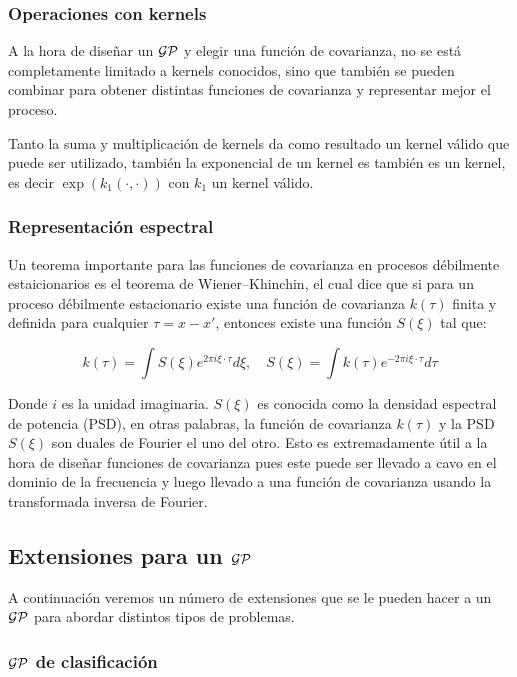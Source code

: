 \subsubsection{Operaciones con kernels}
A la hora de diseñar un $\mathcal{GP}$ y elegir una función de covarianza, no se está completamente limitado a kernels conocidos, sino que también se pueden combinar para obtener distintas funciones de covarianza y representar mejor el proceso.

Tanto la suma y multiplicación de kernels da como resultado un kernel válido que puede ser utilizado, también la exponencial de un kernel es también es un kernel, es decir $\exp(k_1(\cdot, \cdot))$ con $k_1$ un kernel válido.

\subsubsection{Representación espectral}
Un teorema importante para las funciones de covarianza en procesos débilmente estaicionarios es el teorema de Wiener–Khinchin, el cual dice que si para un proceso débilmente estacionario existe una función de covarianza $k(\tau)$ finita y definida para cualquier $\tau=x-x'$, entonces existe una función $S(\xi)$ tal que:

\begin{equation}\label{eq:gp_spectral}
	k(\tau) = \int S(\xi)e^{2\pi i \xi \cdot \tau} d\xi, \quad S(\xi)=\int k(\tau)e^{-2\pi i \xi \cdot \tau} d\tau
\end{equation}

Donde $i$ es la unidad imaginaria. $S(\xi)$ es conocida como la densidad espectral de potencia (PSD), en otras palabras, la función de covarianza $k(\tau)$ y la PSD $S(\xi)$ son duales de Fourier el uno del otro. Esto es extremadamente útil a la hora de diseñar funciones de covarianza pues este puede ser llevado a cavo en el dominio de la frecuencia y luego llevado a una función de covarianza usando la transformada inversa de Fourier.

\subsection{Extensiones para un $\mathcal{GP}$}
A continuación veremos un número de extensiones que se le pueden hacer a un $\mathcal{GP}$ para abordar distintos tipos de problemas.

\subsubsection{$\mathcal{GP}$ de clasificación}

